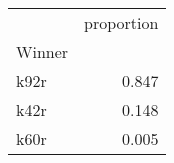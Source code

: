 \begin{tabular}{lr}
\toprule
 & proportion \\
Winner &  \\
\midrule
k92r & 0.847 \\
k42r & 0.148 \\
k60r & 0.005 \\
\bottomrule
\end{tabular}
